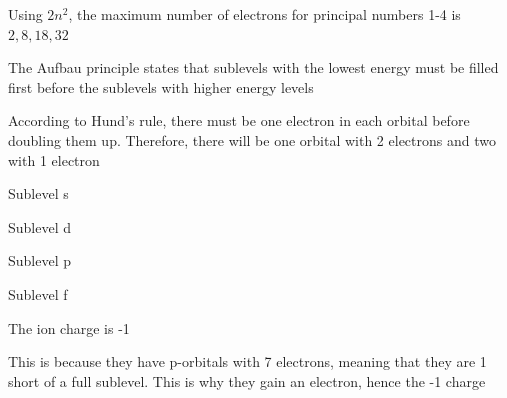 \begin{solutions}
    \item Using $2n^2$, the maximum number of electrons for principal numbers 1-4 is $2, 8, 18,
        32$
    \item The Aufbau principle states that sublevels with the lowest energy must be filled first
        before the sublevels with higher energy levels
    \item According to Hund's rule, there must be one electron in each orbital before doubling
        them up. Therefore, there will be one orbital with 2 electrons and two with 1 electron
    \item
        \begin{enum-alph}
            \item Sublevel s
            \item Sublevel d
            \item Sublevel p
            \item Sublevel f
        \end{enum-alph}
    \item 
        \begin{enum-alph}
            \item The ion charge is -1
            \item This is because they have p-orbitals with 7 electrons, meaning that they
                are 1 short of a full sublevel. This is why they gain an electron, hence the -1
                charge
        \end{enum-alph}


\end{solutions}
